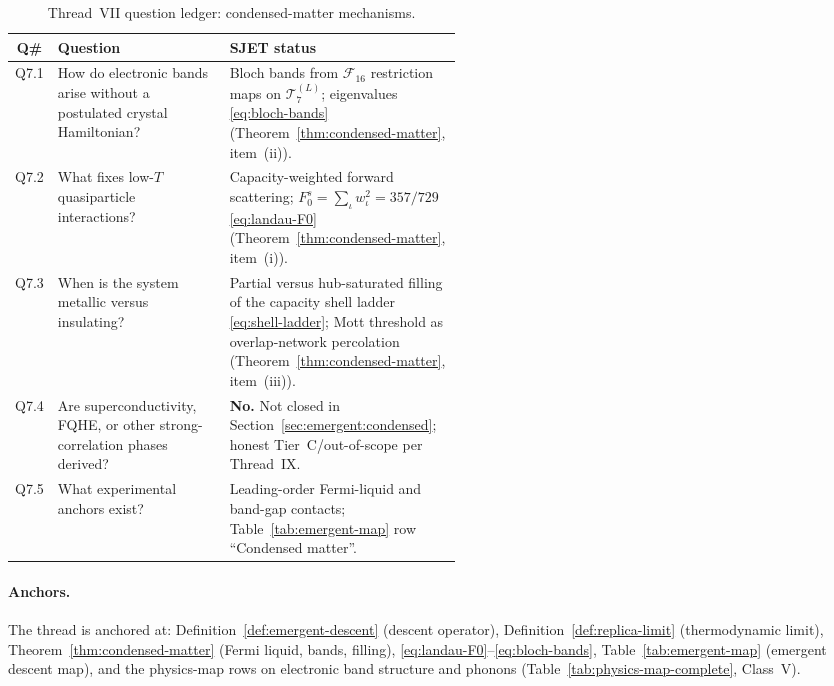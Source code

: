 \begin{table}[ht]
\centering
\small
\renewcommand{\arraystretch}{1.12}
\begin{tabular}{@{}clp{0.52\linewidth}@{}}
\toprule
\textbf{Q\#} & \textbf{Question} & \textbf{SJET status} \\
\midrule
Q7.1 &
  How do electronic bands arise without a postulated crystal Hamiltonian? &
  Bloch bands from $\mathcal{F}_{16}$ restriction maps on
  $\mathcal{T}_7^{(L)}$; eigenvalues \eqref{eq:bloch-bands}
  (Theorem~\ref{thm:condensed-matter}, item~(ii)). \\
\addlinespace
Q7.2 &
  What fixes low-$T$ quasiparticle interactions? &
  Capacity-weighted forward scattering;
  $F_0^s=\sum_\iota w_\iota^2=357/729$ \eqref{eq:landau-F0}
  (Theorem~\ref{thm:condensed-matter}, item~(i)). \\
\addlinespace
Q7.3 &
  When is the system metallic versus insulating? &
  Partial versus hub-saturated filling of the capacity shell ladder
  \eqref{eq:shell-ladder}; Mott threshold as overlap-network percolation
  (Theorem~\ref{thm:condensed-matter}, item~(iii)). \\
\addlinespace
Q7.4 &
  Are superconductivity, FQHE, or other strong-correlation phases derived? &
  \textbf{No.} Not closed in Section~\ref{sec:emergent:condensed};
  honest Tier~C/out-of-scope per Thread~IX. \\
\addlinespace
Q7.5 &
  What experimental anchors exist? &
  Leading-order Fermi-liquid and band-gap contacts;
  Table~\ref{tab:emergent-map} row ``Condensed matter''. \\
\bottomrule
\end{tabular}
\caption{Thread~VII question ledger: condensed-matter mechanisms.}
\label{tab:thread-7-questions}
\end{table}

\paragraph{Anchors.}
The thread is anchored at:
Definition~\ref{def:emergent-descent} (descent operator),
Definition~\ref{def:replica-limit} (thermodynamic limit),
Theorem~\ref{thm:condensed-matter} (Fermi liquid, bands, filling),
\eqref{eq:landau-F0}--\eqref{eq:bloch-bands},
Table~\ref{tab:emergent-map} (emergent descent map),
and the physics-map rows on electronic band structure and phonons
(Table~\ref{tab:physics-map-complete}, Class~V).

